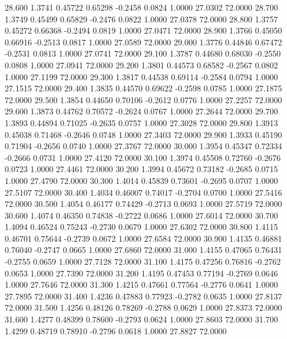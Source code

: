   28.600   1.3741   0.45722   0.65298  -0.2458   0.0824   1.0000  27.0302  72.0000
  28.700   1.3749   0.45499   0.65829  -0.2476   0.0822   1.0000  27.0378  72.0000
  28.800   1.3757   0.45272   0.66368  -0.2494   0.0819   1.0000  27.0471  72.0000
  28.900   1.3766   0.45050   0.66916  -0.2513   0.0817   1.0000  27.0589  72.0000
  29.000   1.3776   0.44846   0.67472  -0.2531   0.0813   1.0000  27.0741  72.0000
  29.100   1.3787   0.44680   0.68030  -0.2550   0.0808   1.0000  27.0941  72.0000
  29.200   1.3801   0.44573   0.68582  -0.2567   0.0802   1.0000  27.1199  72.0000
  29.300   1.3817   0.44538   0.69114  -0.2584   0.0794   1.0000  27.1515  72.0000
  29.400   1.3835   0.44570   0.69622  -0.2598   0.0785   1.0000  27.1875  72.0000
  29.500   1.3854   0.44650   0.70106  -0.2612   0.0776   1.0000  27.2257  72.0000
  29.600   1.3873   0.44762   0.70572  -0.2624   0.0767   1.0000  27.2644  72.0000
  29.700   1.3893   0.44894   0.71025  -0.2635   0.0757   1.0000  27.3028  72.0000
  29.800   1.3913   0.45038   0.71468  -0.2646   0.0748   1.0000  27.3403  72.0000
  29.900   1.3933   0.45190   0.71904  -0.2656   0.0740   1.0000  27.3767  72.0000
  30.000   1.3954   0.45347   0.72334  -0.2666   0.0731   1.0000  27.4120  72.0000
  30.100   1.3974   0.45508   0.72760  -0.2676   0.0723   1.0000  27.4461  72.0000
  30.200   1.3994   0.45672   0.73182  -0.2685   0.0715   1.0000  27.4790  72.0000
  30.300   1.4014   0.45839   0.73601  -0.2695   0.0707   1.0000  27.5107  72.0000
  30.400   1.4034   0.46007   0.74017  -0.2704   0.0700   1.0000  27.5416  72.0000
  30.500   1.4054   0.46177   0.74429  -0.2713   0.0693   1.0000  27.5719  72.0000
  30.600   1.4074   0.46350   0.74838  -0.2722   0.0686   1.0000  27.6014  72.0000
  30.700   1.4094   0.46524   0.75243  -0.2730   0.0679   1.0000  27.6302  72.0000
  30.800   1.4115   0.46701   0.75644  -0.2739   0.0672   1.0000  27.6584  72.0000
  30.900   1.4135   0.46881   0.76040  -0.2747   0.0665   1.0000  27.6860  72.0000
  31.000   1.4155   0.47065   0.76431  -0.2755   0.0659   1.0000  27.7128  72.0000
  31.100   1.4175   0.47256   0.76816  -0.2762   0.0653   1.0000  27.7390  72.0000
  31.200   1.4195   0.47453   0.77194  -0.2769   0.0646   1.0000  27.7646  72.0000
  31.300   1.4215   0.47661   0.77564  -0.2776   0.0641   1.0000  27.7895  72.0000
  31.400   1.4236   0.47883   0.77923  -0.2782   0.0635   1.0000  27.8137  72.0000
  31.500   1.4256   0.48126   0.78269  -0.2788   0.0629   1.0000  27.8373  72.0000
  31.600   1.4277   0.48399   0.78600  -0.2793   0.0624   1.0000  27.8603  72.0000
  31.700   1.4299   0.48719   0.78910  -0.2796   0.0618   1.0000  27.8827  72.0000
